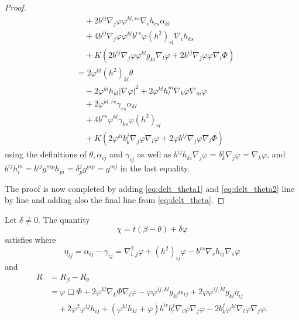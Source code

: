 \documentclass{amsart}
\begin{document}
\begin{proof}
\begin{equation}
\begin{split}
&\quad + 2 b^{ij} \nabla_j\varphi \varphi^{kl,rs}\nabla_i h_{rs} \alpha_{kl} \\
&\quad + 4 b^{ij} \nabla_j\varphi \varphi^{kl} b^{rs} \varphi(h^2)_{rl} \nabla_i h_{ks} \\
&\quad + K\left(2 b^{ij} \nabla_j\varphi \varphi^{kl}g_{ki} \nabla_l \varphi + 2 b^{ij} \nabla_j\varphi \varphi \nabla_i \Phi\right) \\
&= 2 \varphi^{kl}(h^2)_{kl}\theta \\
&\quad - 2 \varphi^{kl}h_{kl} |\nabla\varphi|^2 + 2 \varphi^{kl} h^{m}_{l} \nabla_k\varphi \nabla_m \varphi \\
&\quad + 2 \varphi^{kl,rs} \gamma_{rs} \alpha_{kl} \\
&\quad + 4 b^{rs} \varphi^{kl} \gamma_{ks} \varphi(h^2)_{rl} \\
&\quad + K\left(2 \varphi^{kl} b^j_k \nabla_j\varphi \nabla_l \varphi + 2 \varphi b^{ij} \nabla_j\varphi \nabla_i \Phi\right)
\end{split}
\end{equation}
using the definitions of \(\theta, \alpha_{ij}\) and \(\gamma_{ij}\) as well as \(b^{ij}h_{ki} \nabla_j \varphi = \delta^j_k \nabla_j \varphi = \nabla_k \varphi\), and \(b^{ij} h^m_i = b^{ij} g^{mp}h_{pi} = \delta^j_p g^{mp} = g^{mj}\) in the last equality.

The proof is now completed by adding \cref{eq:delt_theta1} and \cref{eq:delt_theta2} line by line and adding also the final line from \cref{eq:delt_theta}.
\end{proof}

\begin{theorem}
\label{thm:Evchi}
Let $\delta \neq 0.$ The quantity
\[
\chi = t(\beta - \theta) + \delta\varphi
\]
satisfies
where
\[
\eta_{ij} = \alpha_{ij} - \gamma_{ij} = \nabla^2_{i,j}\varphi + (h^2)_{ij}\varphi - b^{rs}\nabla_r h_{ij}\nabla_s \varphi
\]
and
\[
\begin{split}
R &= R_{\beta} - R_{\theta} \\
&= \varphi \Box \Phi + 2\varphi^{kl} \nabla_k \Phi \nabla_l \varphi-\varphi \varphi^{ij,kl}g_{kl} \alpha_{ij} + 2\varphi \varphi^{ij,kl}g_{kl} \eta_{ij}  \\
&\quad + 2\varphi^{2}\varphi^{ij}h_{ij} +(\varphi^{kl}h_{kl} + \varphi)b^{ir}b^{j}_{r}\nabla_i \varphi\nabla_j\varphi - 2 b^{j}_{k}\varphi^{kl}\nabla_l\varphi\nabla_j\varphi.
\end{split}
\]

\end{theorem}
\end{document}
